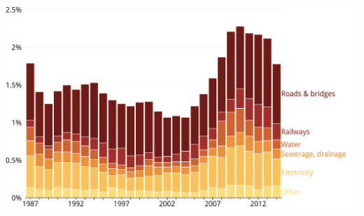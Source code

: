 \documentclass[tikz]{standalone}\usepackage[]{graphicx}\usepackage[]{color}
\newenvironment{knitrout}{}{} %
\begin{document}
\clearpage
\begin{knitrout}
\color{fgcolor}
\includegraphics[width=12.1in,height=7in]{./b5-figure/FISCAL-Figure14-1} 

\end{knitrout}
\end{document}
